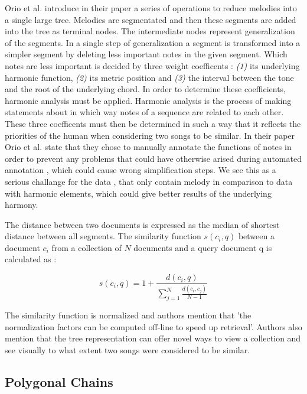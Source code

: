 \documentclass{llncs}
\begin{document}
		Orio et al. \cite{two_point_four} introduce in their paper a series of operations to reduce melodies into a single large tree. Melodies are segmentated and then these segments are added into the tree as terminal nodes. The intermediate nodes represent generalization of the segments. 
		In a single step of generalization a segment is transformed into a simpler segment by deleting less important notes in the given segment. Which notes are less important is decided by three weight coefficents : \textit{(1)} its underlying harmonic function, \textit{(2)} its metric position  and \textit{(3)} the interval between the tone and the root of the underlying chord. 
		In order to determine these coefficients, harmonic analysis must be applied. Harmonic analysis is the process of making statements about in which way notes of a sequence are related to each other. These three coefficents must then be determined in such a way that it reflects the priorities of the human when considering two songs to be similar. 
		In their paper Orio et al. state that they chose to manually annotate the functions of notes in order to prevent any problems that could have otherwise arised during automated annotation , which could cause wrong simplification steps. We see this as a serious challange for the data , that only contain melody in comparison to data with harmonic elements, which could give better results of the underlying harmony. 

		The distance between two documents is expressed as the median of shortest distance between all segments. The similarity function $s(c_i , q)$ between a document $c_i$ from a collection of $N$ documents and a query document q is calculated as :
		
		\begin{equation}
			s(c_i , q)= 1 + \frac{d(c_i , q)}{\sum_{j=1}^{N} \frac{d(c_i,c_j)}{N-1}} 
		\end{equation}

		The similarity function is normalized and authors mention that 'the normalization factors can be computed off-line to speed up retrieval'. Authors also mention that the tree representation can offer novel ways to view a collection and see visually to what extent two songs were considered to be similar.

		\subsection{Polygonal Chains}
\end{document}
